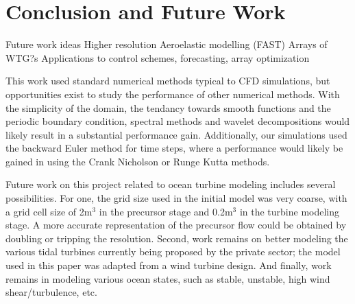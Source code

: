\section{Conclusion and Future Work}

Future work ideas
Higher resolution
Aeroelastic modelling (FAST)
Arrays of WTG?s
Applications to control schemes, forecasting, array optimization

This work used standard numerical methods typical to CFD simulations, but opportunities exist to study the performance of other numerical methods. With the simplicity of the domain, the tendancy towards smooth functions and the periodic boundary condition, spectral methods and wavelet decompositions would likely result in a substantial performance gain. Additionally, our simulations used the backward Euler method for time steps, where a performance would likely be gained in using the Crank Nicholson or Runge Kutta methods.

Future work on this project related to ocean turbine modeling includes several possibilities. For one, the grid size used in the initial model was very coarse, with a grid cell size of 2m$^3$ in the precursor stage and 0.2m$^3$ in the turbine modeling stage. A more accurate representation of the precursor flow could be obtained by doubling or tripping the resolution. Second, work remains on better modeling the various tidal turbines currently being proposed by the private sector; the model used in this paper was adapted from a wind turbine design. And finally, work remains in modeling various ocean states, such as stable, unstable, high wind shear/turbulence, etc.




